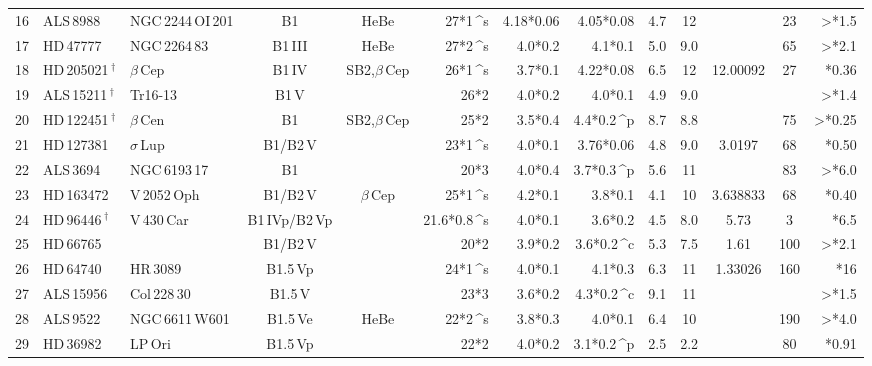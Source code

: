 \begin{longtable}{l l l c c D{*}{\,\pm\,}{4,4} D{*}{\,\pm\,}{4,4} D{*}{\,\pm\,}{6,6} c c c c D{*}{\,}{2,4} }
16 & ALS\,8988 & NGC\,2244\,OI\,201 & B1 & HeBe &27*1\,^{s} & 4.18*0.06 & 4.05*0.08 & 4.7 & 12 &   & 23 & >*1.5 \\ 

17 & HD\,47777 & NGC\,2264\,83 & B1\,III & HeBe &27*2\,^{s} & 4.0*0.2 & 4.1*0.1 & 5.0 & 9.0 &   & 65 & >*2.1 \\ 

18 & HD\,205021\,$^\dagger$ & $\beta$\,Cep & B1\,IV & SB2,$\beta$\,Cep &26*1\,^{s} & 3.7*0.1 & 4.22*0.08 & 6.5 & 12 & 12.00092 & 27 & *0.36 \\ 

19 & ALS\,15211\,$^\dagger$ & Tr16-13 & B1\,V &  &26*2 & 4.0*0.2 & 4.0*0.1 & 4.9 & 9.0 &   &  & >*1.4 \\ 

20 & HD\,122451\,$^\dagger$ & $\beta$\,Cen & B1 & SB2,$\beta$\,Cep &25*2 & 3.5*0.4 & 4.4*0.2\,^{p} & 8.7 & 8.8 &   & 75 & >*0.25 \\ 

21 & HD\,127381 & $\sigma$\,Lup & B1/B2\,V &  &23*1\,^{s} & 4.0*0.1 & 3.76*0.06 & 4.8 & 9.0 & 3.0197 & 68 & *0.50 \\ 

22 & ALS\,3694 & NGC\,6193\,17 & B1 &  &20*3 & 4.0*0.4 & 3.7*0.3\,^{p} & 5.6 & 11 &   & 83 & >*6.0 \\ 

23 & HD\,163472 & V\,2052\,Oph & B1/B2\,V & $\beta$\,Cep &25*1\,^{s} & 4.2*0.1 & 3.8*0.1 & 4.1 & 10 & 3.638833 & 68 & *0.40 \\ 

24 & HD\,96446\,$^\dagger$ & V\,430\,Car	 & B1\,IVp/B2\,Vp &  &21.6*0.8\,^{s} & 4.0*0.1 & 3.6*0.2 & 4.5 & 8.0 & 5.73 & 3 & *6.5 \\ 

25 & HD\,66765 &   & B1/B2\,V &  &20*2 & 3.9*0.2 & 3.6*0.2\,^{c} & 5.3 & 7.5 & 1.61 & 100 & >*2.1 \\ 

26 & HD\,64740 & HR\,3089	 & B1.5\,Vp &  &24*1\,^{s} & 4.0*0.1 & 4.1*0.3 & 6.3 & 11 & 1.33026 & 160 & *16 \\ 

27 & ALS\,15956 & Col\,228\,30 & B1.5\,V &  &23*3 & 3.6*0.2 & 4.3*0.2\,^{c} & 9.1 & 11 &   &  & >*1.5 \\ 

28 & ALS\,9522 & NGC\,6611\,W601	 & B1.5\,Ve & HeBe &22*2\,^{s} & 3.8*0.3 & 4.0*0.1 & 6.4 & 10 &   & 190 & >*4.0 \\ 

29 & HD\,36982 & LP\,Ori & B1.5\,Vp &  &22*2 & 4.0*0.2 & 3.1*0.2\,^{p} & 2.5 & 2.2 &   & 80 & *0.91 \\ 


\end{longtable}
